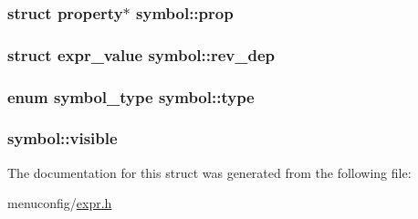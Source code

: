 \hypertarget{structsymbol_aa6b5419b3dceffc8ed3db4890072edbe}{
\subsubsection[{prop}]{\setlength{\rightskip}{0pt plus 5cm}struct {\bf property}$\ast$ symbol\-::prop}}\label{structsymbol_aa6b5419b3dceffc8ed3db4890072edbe}
\hypertarget{structsymbol_a3cad06a65d0ef816b9194995a859422b}{
\subsubsection[{rev\-\_\-dep}]{\setlength{\rightskip}{0pt plus 5cm}struct {\bf expr\-\_\-value} symbol\-::rev\-\_\-dep}}\label{structsymbol_a3cad06a65d0ef816b9194995a859422b}
\hypertarget{structsymbol_aafff7593df974a98ea04be2b7450091e}{
\subsubsection[{type}]{\setlength{\rightskip}{0pt plus 5cm}enum {\bf symbol\-\_\-type} symbol\-::type}}\label{structsymbol_aafff7593df974a98ea04be2b7450091e}
\hypertarget{structsymbol_aac614544cc3553f60cc6e89812c742fe}{
\subsubsection[{visible}]{ symbol\-::visible}}\label{structsymbol_aac614544cc3553f60cc6e89812c742fe}


The documentation for this struct was generated from the following file\-:\begin{DoxyCompactItemize}
\item 
menuconfig/\hyperlink{expr_8h}{expr.\-h}\end{DoxyCompactItemize}
